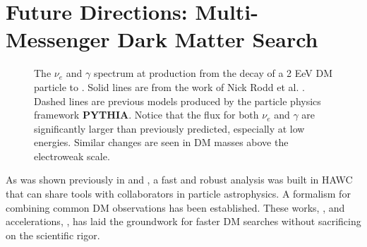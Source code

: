 \section{Future Directions: Multi-Messenger Dark Matter Search}\label{sec:future}

\begin{figure}[h]
    \caption{The $\nu_e$ and $\gamma$ spectrum at production from the decay of a 2 EeV DM particle to . Solid lines are from the work of Nick Rodd et al. \cite{Rodd:HDM_spec}. Dashed lines are previous models produced by the particle physics framework \textbf{PYTHIA}. Notice that the flux for both $\nu_e$ and $\gamma$ are significantly larger than previously predicted, especially at low energies. Similar changes are seen in DM masses above the electroweak scale.}
    \label{fig:nu_and_gam}
\end{figure}

As was shown previously in  and , a fast and robust analysis was built in HAWC that can share tools with collaborators in particle astrophysics.
A formalism for combining common DM observations has been established.
These works, , and accelerations, , has laid the groundwork for faster DM searches without sacrificing on the scientific rigor.

